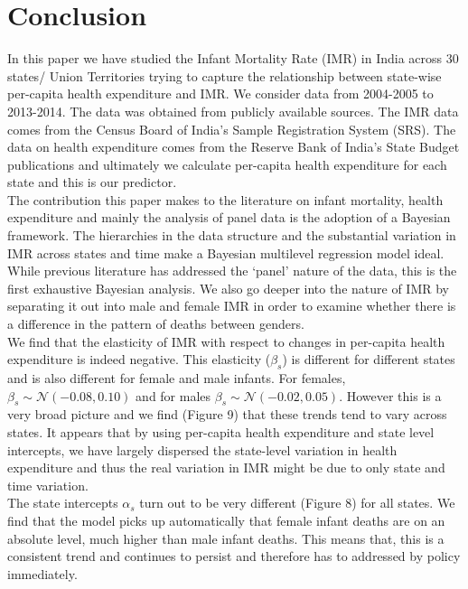 \documentclass{article}
\begin{document}
\section{Conclusion}
In this paper we have studied the Infant Mortality Rate (IMR) in India across 30 states/ Union Territories trying to capture the relationship between state-wise per-capita health expenditure and IMR. We consider data from 2004-2005 to 2013-2014. The data was obtained from publicly available sources. The IMR data comes from the Census Board of India's Sample Registration System (SRS). The data on health expenditure comes from the Reserve Bank of India's State Budget publications and ultimately we calculate per-capita health expenditure for each state and this is our predictor. \\

The contribution this paper makes to the literature on infant mortality, health expenditure and mainly the analysis of panel data is the adoption of a Bayesian framework. The hierarchies in the data structure and the substantial variation in IMR across states and time make a Bayesian multilevel regression model ideal. While previous literature has addressed the `panel' nature of the data, this is the first exhaustive Bayesian analysis. We also go deeper into the nature of IMR by separating it out into male and female IMR in order to examine whether there is a difference in the pattern of deaths between genders.\\

We find that the elasticity of IMR with respect to changes in per-capita health expenditure is indeed negative. This elasticity ($\beta_s$) is different for different states and is also different for female and male infants. For females, $\beta_s \sim \mathcal{N} (-0.08, 0.10)$ and for males $\beta_s \sim \mathcal{N} (-0.02, 0.05)$. However this is a very broad picture and we find (Figure 9) that these trends tend to vary across states. It appears that by using per-capita health expenditure and state level intercepts, we have largely dispersed the state-level variation in health expenditure and thus the real variation in IMR might be due to only state and time variation.\\

The state intercepts $\alpha_s$ turn out to be very different (Figure 8) for all states. We find that the model picks up automatically that female infant deaths are on an absolute level, much higher than male infant deaths. This means that, this is a consistent trend and continues to persist and therefore has to addressed by policy immediately. \\
\end{document}
